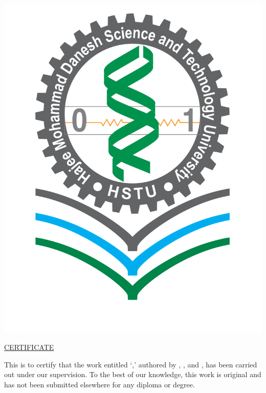 \begin{center}
\large
{}\\
\\
\\
\\
\vspace{10pt}

\includegraphics[scale=0.15]{images/hstu_logo.png}

\underline{\Large {CERTIFICATE}}
\end{center}
\vspace{20pt}

This is to certify that the work entitled `\textit{\textbf{\thesistitle}},' authored by {\authorA}, {\authorB}, and {\authorC}, has been carried out under our supervision.
To the best of our knowledge, this work is original and has not been submitted elsewhere for any diploma or degree.\\


